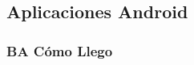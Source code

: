\documentclass[10pt,a4paper]{article}
\begin{document}
\pagebreak
 
\subsection{Aplicaciones Android}

\subsubsection{BA Cómo Llego}

\begin{figure}[ht]       
    \hspace{38px}

\end{figure}
\end{document}
